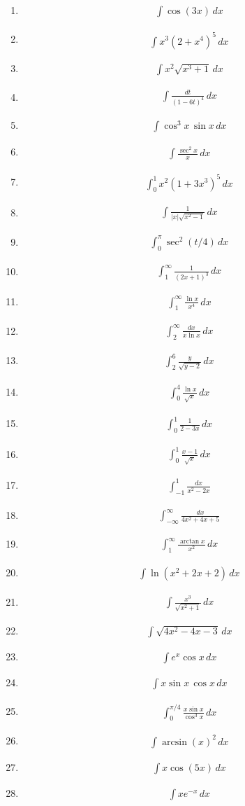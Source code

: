 \documentclass[twoside, fleqn,12pt,letterpaper]{book}
\newcommand{\makeitem}[2]{\item {#2}\begin{align*} {#1}
  \end{align*}}
\newcommand{\makeitemtextb}[1]{\makeitem{{#1}}{\cite{RosTextbook}}}
\begin{document}
\begin{multicols}{2}
\begin{enumerate}
  \makeitemtextb{\int \cos(3x) \, dx}
  
  \makeitemtextb{ \int x^3(2+x^4)^5 \, dx}
  
  \makeitemtextb{ \int x^2\sqrt{x^3+1} \, dx}
  
  \makeitemtextb{\int\frac{dt}{(1-6t)^4} \, dx}
  
 \makeitemtextb{\int \cos^3 x\,\sin x \, dx}
  
  \makeitemtextb{\int \frac{\sec^2{x}}{x} \, dx}
  
  \makeitemtextb{\int_{0}^{1} x^2(1+3x^3)^5 \, dx}
  
  \makeitemtextb{\int \frac{1}{|x|\sqrt{x^2-1}} \, dx}
  
  \makeitemtextb{\int_{0}^{\pi}\sec^2(t/4) \, dx}
  
  \makeitemtextb{\int_{1}^{\infty}\frac{1}{(2x+1)^3} \, dx}
  
  \makeitemtextb{\int_{1}^{\infty}\frac{\ln x}{x^4} \, dx}
   
  \makeitemtextb{\int_{2}^{\infty}\frac{dx}{x\ln x} \, dx}
  
  \makeitemtextb {\int_{2}^{6}\frac{y}{\sqrt{y-2}} \, dx}
  
  \makeitemtextb {\int_{0}^{4}\frac{\ln x}{\sqrt{x}} \, dx}
  
  \makeitemtextb {\int_{0}^{1}\frac{1}{2-3x} \, dx}
  
  \makeitemtextb {\int_{0}^{1}\frac{x-1}{\sqrt{x}} \, dx}
  
  \makeitemtextb {\int_{-1}^{1}\frac{dx}{x^2-2x}}
  
  \makeitemtextb {\int_{-\infty}^{\infty}\frac{dx}{4x^2+4x+5}}
  
  \makeitemtextb {\int_{1}^{\infty}\frac{\arctan x}{x^2} \, dx}
  
  \makeitemtextb {\int \ln(x^2+2x+2) \, dx}
  
  \makeitemtextb {\int\frac{x^3}{\sqrt{x^2+1}} \, dx}
  
  \makeitemtextb {\int \sqrt{4x^2-4x-3} \, dx}
  
  \makeitemtextb {\int e^{x}\cos x \, dx}
  
  \makeitemtextb {\int x\sin x\,\cos x \, dx}
  
  \makeitemtextb {\int_{0}^{\pi/4}\frac{x\sin x}{\cos^3 x} \, dx }
  
  \makeitemtextb {\int \arcsin(x)^2 \, dx}
  
  \makeitemtextb {\int x\cos(5x) \, dx}
  
  \makeitemtextb {\int xe^{-x} \, dx}
  

\end{enumerate}
\end{multicols}
\end{document}
